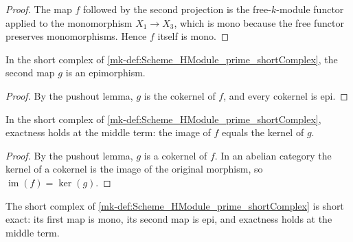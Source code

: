 \begin{proof}
  \leanok

  The map \(f\) followed by the second projection is the free-\(k\)-module functor applied to the monomorphism \(X_1 \to X_3\), which is mono because the free functor preserves monomorphisms. Hence \(f\) itself is mono.
\end{proof}

\begin{lemma}\label{mk-lem:Scheme_HModule_prime_shortComplex_g_epi}
  \leanok


  In the short complex of \ref{mk-def:Scheme_HModule_prime_shortComplex}, the second map \(g\) is an epimorphism.
\end{lemma}

\begin{proof}
  \leanok

  By the pushout lemma, \(g\) is the cokernel of \(f\), and every cokernel is epi.
\end{proof}

\begin{lemma}\label{mk-lem:Scheme_HModule_prime_shortComplex_exact}
  \leanok


  In the short complex of \ref{mk-def:Scheme_HModule_prime_shortComplex}, exactness holds at the middle term: the image of \(f\) equals the kernel of \(g\).
\end{lemma}

\begin{proof}
  \leanok

  By the pushout lemma, \(g\) is a cokernel of \(f\). In an abelian category the kernel of a cokernel is the image of the original morphism, so \(\operatorname{im}(f)=\ker(g)\).
\end{proof}

\begin{lemma}\label{mk-lem:Scheme_HModule_prime_shortComplex_shortExact}
  \leanok


  The short complex of \ref{mk-def:Scheme_HModule_prime_shortComplex} is short exact: its first map is mono, its second map is epi, and exactness holds at the middle term.
\end{lemma}

